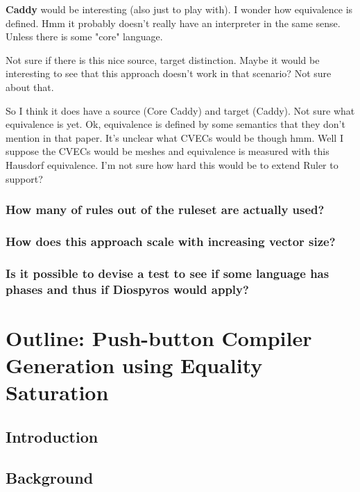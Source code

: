 \documentclass[11pt]{article}
\begin{document}
\textbf{Caddy} would be interesting (also just to play with). I wonder how equivalence is defined.
Hmm it probably doesn't really have an interpreter in the same sense. Unless there is some "core" language.

Not sure if there is this nice source, target distinction. Maybe it would be interesting to see that this approach doesn't work in that scenario? Not sure about that.

So I think it does have a source (Core Caddy) and target (Caddy). Not sure what equivalence is yet. Ok, equivalence is defined by some semantics that they don't mention in that paper. It's unclear what CVECs would be though hmm. Well I suppose the CVECs would be meshes and equivalence is measured with this Hausdorf equivalence. I'm not sure how hard this would be to extend Ruler to support?

\subsubsection{How many of rules out of the ruleset are actually used?}
\label{sec:org5e9c3e3}

\subsubsection{How does this approach scale with increasing vector size?}
\label{sec:orgf9f44ec}

\subsubsection{Is it possible to devise a test to see if some language has phases and thus if Diospyros would apply?}
\label{sec:orgd33b2e7}

\section{Outline: Push-button Compiler Generation using Equality Saturation}
\label{sec:org4caa40d}

\subsection{Introduction}
\label{sec:org96cc4ff}

\subsection{Background}
\label{sec:orgaeb0aa2}
\end{document}
